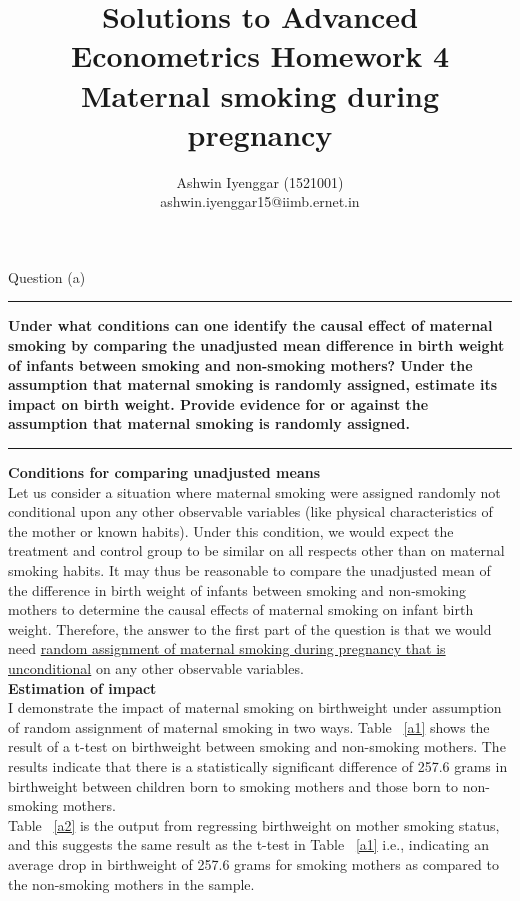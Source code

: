\documentclass[12pt]{article}
\newcommand\question[1]{\vspace{1em}\hrule\vspace{1em}\textbf{#1}\vspace{1em}\hrule\vspace{1em}}
\begin{document}
\title{Solutions to Advanced Econometrics Homework 4\\Maternal smoking during pregnancy}
\author{Ashwin Iyenggar  (1521001) \\ ashwin.iyenggar15@iimb.ernet.in} 


\maketitle
\thispagestyle{empty}


\begin{center}\LARGE{Question (a)}\end{center}
\question{Under what conditions can one identify the causal effect of maternal smoking by comparing the unadjusted mean difference in birth weight of infants between smoking and non-smoking mothers?  Under the assumption that maternal smoking is randomly assigned, estimate its impact on birth weight.  Provide evidence for or against the assumption that maternal smoking is randomly assigned.}

\textbf{Conditions for comparing unadjusted means}\\
Let us consider a situation where maternal smoking were assigned randomly not conditional upon any other observable variables (like physical characteristics of the mother or known habits). Under this condition, we would expect the treatment and control group to be similar on all respects other than on maternal smoking habits. It may thus be reasonable to compare the unadjusted mean of the difference in birth weight of infants between smoking and non-smoking mothers to determine the causal effects of maternal smoking on infant birth weight. Therefore, the answer to the first part of the question is that we would need \uline{random assignment of maternal smoking during pregnancy that is unconditional} on any other observable variables.\\

\textbf{Estimation of impact}\\
I demonstrate the impact of maternal smoking on birthweight under assumption of random assignment of maternal smoking in two ways. Table ~\ref{a1} shows the result of a t-test on birthweight between smoking and non-smoking mothers. The results indicate that there is a statistically significant difference of 257.6 grams in birthweight between children born to smoking mothers and those born to non-smoking mothers.\\ Table ~\ref{a2} is the output from regressing birthweight on mother smoking status, and this suggests the same result as the t-test in Table ~\ref{a1} i.e., indicating an average drop in birthweight of 257.6 grams for smoking mothers as compared to the non-smoking mothers in the sample.\\
\end{document}
